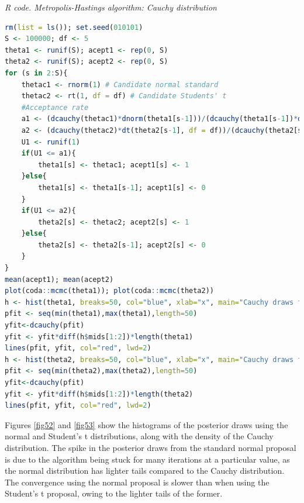 \begin{enumerate}[leftmargin=*]
\begin{tcolorbox}[enhanced,width=4.67in,center upper,
	fontupper=\large\bfseries,drop shadow southwest,sharp corners]
	\textit{R code. Metropolis-Hastings algorithm: Cauchy distribution}
	\begin{VF}
		\begin{lstlisting}[language=R]
rm(list = ls()); set.seed(010101)
S <- 100000; df <- 5
theta1 <- runif(S); acept1 <- rep(0, S)
theta2 <- runif(S); acept2 <- rep(0, S)
for (s in 2:S){
	thetac1 <- rnorm(1) # Candidate normal standard
	thetac2 <- rt(1, df = df) # Candidate Students' t
	#Acceptance rate
	a1 <- (dcauchy(thetac1)*dnorm(theta1[s-1]))/(dcauchy(theta1[s-1])*dnorm(thetac1)) 
	a2 <- (dcauchy(thetac2)*dt(theta2[s-1], df = df))/(dcauchy(theta2[s-1])*dt(thetac2, df = df))
	U1 <- runif(1)
	if(U1 <= a1){
		theta1[s] <- thetac1; acept1[s] <- 1
	}else{
		theta1[s] <- theta1[s-1]; acept1[s] <- 0
	}
	if(U1 <= a2){
		theta2[s] <- thetac2; acept2[s] <- 1
	}else{		
		theta2[s] <- theta2[s-1]; acept2[s] <- 0
	}
}
mean(acept1); mean(acept2)
plot(coda::mcmc(theta1)); plot(coda::mcmc(theta2))
h <- hist(theta1, breaks=50, col="blue", xlab="x", main="Cauchy draws from a Metropolis-Hastings algorithm: Normal standard proposal")
pfit <- seq(min(theta1),max(theta1),length=50)
yfit<-dcauchy(pfit)
yfit <- yfit*diff(h$mids[1:2])*length(theta1)
lines(pfit, yfit, col="red", lwd=2)
h <- hist(theta2, breaks=50, col="blue", xlab="x", main="Cauchy draws from a Metropolis-Hastings algorithm: Student's t proposal")
pfit <- seq(min(theta2),max(theta2),length=50)
yfit<-dcauchy(pfit)
yfit <- yfit*diff(h$mids[1:2])*length(theta2)
lines(pfit, yfit, col="red", lwd=2)
\end{lstlisting}
	\end{VF}
\end{tcolorbox} 

Figures \ref{fig52} and \ref{fig53} show the histograms of the posterior draws using the normal and Student's t distributions, along with the density of the Cauchy distribution. The spike in the posterior draws from the standard normal proposal is due to the algorithm being stuck for many iterations at a particular value, as the normal distribution has lighter tails compared to the Cauchy distribution. The convergence using the normal proposal is slower than when using the Student's t proposal, owing to the lighter tails of the former.


\end{enumerate}
